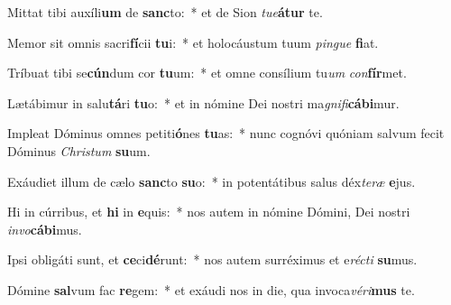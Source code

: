 \item Mittat tibi auxíli\textbf{um} de \textbf{sanc}to:~* et de Sion \textit{tu}\textit{e}\textbf{á}\textbf{tur} te.
\item Memor sit omnis sacri\textbf{fí}cii \textbf{tu}i:~* et holocáustum tuum \textit{pin}\textit{gue} \textbf{fi}at.
\item Tríbuat tibi se\textbf{cún}dum cor \textbf{tu}um:~* et omne consílium tu\textit{um} \textit{con}\textbf{fír}met.
\item Lætábimur in salu\textbf{tá}ri \textbf{tu}o:~* et in nómine Dei nostri ma\textit{gni}\textit{fi}\textbf{cá}\textbf{bi}mur.
\item Impleat Dóminus omnes petiti\textbf{ó}nes \textbf{tu}as:~* nunc cognóvi quóniam salvum fecit Dóminus \textit{Chris}\textit{tum} \textbf{su}um.
\item Exáudiet illum de cælo \textbf{sanc}to \textbf{su}o:~* in potentátibus salus déx\textit{te}\textit{ræ} \textbf{e}jus.
\item Hi in cúrribus, et \textbf{hi} in \textbf{e}quis:~* nos autem in nómine Dómini, Dei nostri \textit{in}\textit{vo}\textbf{cá}\textbf{bi}mus.
\item Ipsi obligáti sunt, et \textbf{ce}ci\textbf{dé}runt:~* nos autem surréximus et e\textit{réc}\textit{ti} \textbf{su}mus.
\item Dómine \textbf{sal}vum fac \textbf{re}gem:~* et exáudi nos in die, qua invoca\textit{vé}\textit{ri}\textbf{mus} te.
